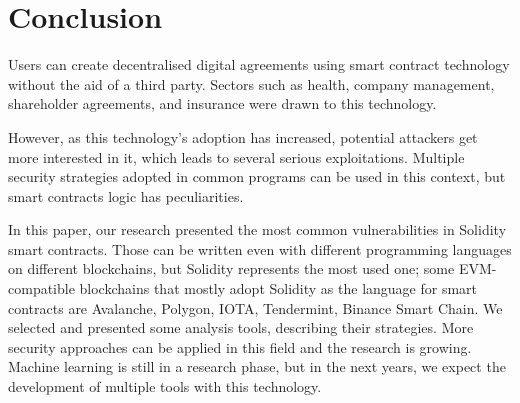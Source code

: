 \documentclass[a4paper,sigconf, language=french,
language=german, language=spanish, language=english]{acmart}
\begin{document}
\section{Conclusion}
\label{Conclusion}
Users can create decentralised digital agreements using smart contract technology without the aid of a third party.
Sectors such as health, company management, shareholder agreements, and insurance were drawn to this technology.

However, as this technology's adoption has increased, potential attackers get more interested in it, which leads to several serious exploitations. 
Multiple security strategies adopted in common programs can be used in this context, but smart contracts logic has peculiarities.

In this paper, our research presented the most common vulnerabilities in Solidity smart contracts. Those can be written even with different programming languages on different blockchains, but Solidity represents the most used one; some EVM-compatible blockchains that mostly adopt Solidity as the language for smart contracts are Avalanche, Polygon, IOTA, Tendermint, Binance Smart Chain.
We selected and presented some analysis tools, describing their strategies. More security approaches can be applied in this field and the research is growing. Machine learning is still in a research phase, but in the next years, we expect the development of multiple tools with this technology.




\end{document}
